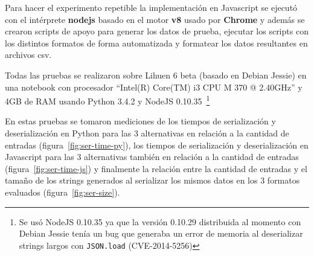 Para hacer el experimento repetible la implementación en
Javascript se ejecutó con el intérprete \textbf{nodejs} basado en
el motor \textbf{v8} usado por \textbf{Chrome} y además se crearon
scripts de apoyo para generar los datos de prueba, ejecutar los scripts
con los distintos formatos de forma automatizada y formatear los datos
resultantes en archivos csv.

Todas las pruebas se realizaron sobre Lihuen 6 beta (basado en Debian Jessie)
en una notebook con procesador ``Intel(R) Core(TM) i3 CPU M 370 @ 2.40GHz''
y 4GB de RAM %
usando Python 3.4.2 y NodeJS 0.10.35~\footnote{Se usó NodeJS 0.10.35 ya que
la versión 0.10.29 distribuida al momento con Debian Jessie tenía un bug que
generaba un error de memoria al
deserializar strings largos con \texttt{JSON.load} (CVE-2014-5256)}

En estas pruebas se tomaron mediciones de los tiempos de serialización y deserialización
en Python para las 3 alternativas en relación a la cantidad de entradas
(figura~\ref{fig:ser-time-py}), los tiempos de serialización y deserialización en
Javascript para las 3 alternativas también en relación a la cantidad de entradas
(figura~\ref{fig:ser-time-js}) y finalmente la relación entre la cantidad de
entradas y el tamaño de los strings generados al serializar los mismos datos en los 3 formatos
evaluados
(figura~\ref{fig:ser-size}).

